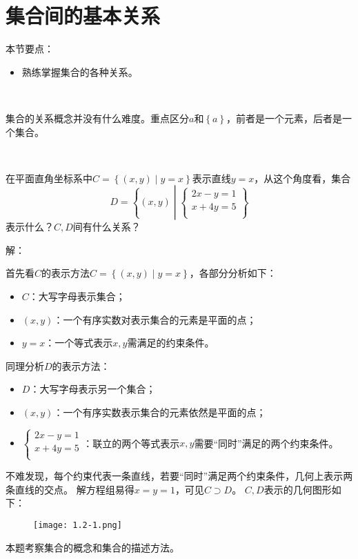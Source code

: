 \section{集合间的基本关系}

本节要点：
\begin{itemize}
    \item 熟练掌握集合的各种关系。
\end{itemize}

~

集合的关系概念并没有什么难度。重点区分$a$和$\left\{ a \right\} $，前者是一个元素，后者是一个集合。

~

\begin{example}
在平面直角坐标系中$C=\left\{ \left( x,y \right) \middle| y=x \right\} $表示直线$y=x$，从这个角度看，集合
\[
D=\left\{ \left( x,y \right) \middle| \left\{ \begin{array}{c}
	2x-y=1\\
	x+4y=5\\
\end{array} \right. \right\}
\]
表示什么？$C,D$间有什么关系？
\end{example}

解：

首先看$C$的表示方法$C=\left\{ \left( x,y \right) \middle| y=x \right\} $，各部分分析如下：
\begin{itemize}
    \item $C$：大写字母表示集合；
    \item $\left( x,y \right) $：一个有序实数对表示集合的元素是平面的点；
    \item $y=x$：一个等式表示$x,y$需满足的约束条件。
\end{itemize}
同理分析$D$的表示方法：
\begin{itemize}
    \item $D$：大写字母表示另一个集合；
    \item $\left( x,y \right) $：一个有序实数表示集合的元素依然是平面的点；
    \item $\left\{ \begin{array}{c}
        2x-y=1\\
        x+4y=5\\
    \end{array} \right. $：联立的两个等式表示$x,y$需要“同时”满足的两个约束条件。
\end{itemize}
不难发现，每个约束代表一条直线，若要“同时”满足两个约束条件，几何上表示两条直线的交点。
解方程组易得$x=y=1$，可见$C\supset D$。
$C,D$表示的几何图形如下：

\begin{figure}[h]
\centering
\texttt{[image: 1.2-1.png]}
\end{figure}

\begin{tcolorbox}
本题考察集合的概念和集合的描述方法。
\end{tcolorbox}




